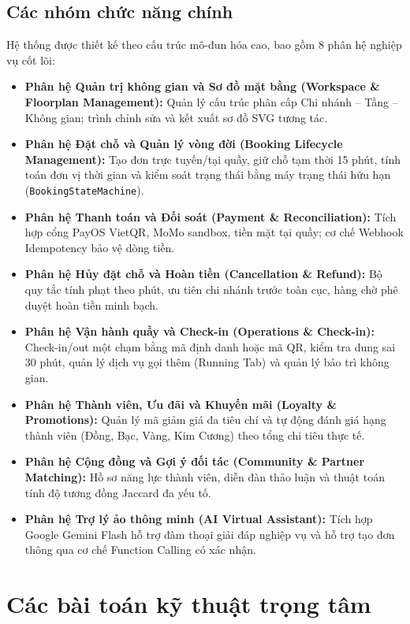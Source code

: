 \subsection{Các nhóm chức năng chính}
Hệ thống được thiết kế theo cấu trúc mô-đun hóa cao, bao gồm 8 phân hệ nghiệp vụ cốt lõi:
\begin{itemize}
    \item \textbf{Phân hệ Quản trị không gian và Sơ đồ mặt bằng (Workspace \& Floorplan Management):} Quản lý cấu trúc phân cấp Chi nhánh -- Tầng -- Không gian; trình chỉnh sửa và kết xuất sơ đồ SVG tương tác.
    \item \textbf{Phân hệ Đặt chỗ và Quản lý vòng đời (Booking Lifecycle Management):} Tạo đơn trực tuyến/tại quầy, giữ chỗ tạm thời 15 phút, tính toán đơn vị thời gian và kiểm soát trạng thái bằng máy trạng thái hữu hạn (\texttt{BookingStateMachine}).
    \item \textbf{Phân hệ Thanh toán và Đối soát (Payment \& Reconciliation):} Tích hợp cổng PayOS VietQR, MoMo sandbox, tiền mặt tại quầy; cơ chế Webhook Idempotency bảo vệ dòng tiền.
    \item \textbf{Phân hệ Hủy đặt chỗ và Hoàn tiền (Cancellation \& Refund):} Bộ quy tắc tính phạt theo phút, ưu tiên chi nhánh trước toàn cục, hàng chờ phê duyệt hoàn tiền minh bạch.
    \item \textbf{Phân hệ Vận hành quầy và Check-in (Operations \& Check-in):} Check-in/out một chạm bằng mã định danh hoặc mã QR, kiểm tra dung sai 30 phút, quản lý dịch vụ gọi thêm (Running Tab) và quản lý bảo trì không gian.
    \item \textbf{Phân hệ Thành viên, Ưu đãi và Khuyến mãi (Loyalty \& Promotions):} Quản lý mã giảm giá đa tiêu chí và tự động đánh giá hạng thành viên (Đồng, Bạc, Vàng, Kim Cương) theo tổng chi tiêu thực tế.
    \item \textbf{Phân hệ Cộng đồng và Gợi ý đối tác (Community \& Partner Matching):} Hồ sơ năng lực thành viên, diễn đàn thảo luận và thuật toán tính độ tương đồng Jaccard đa yếu tố.
    \item \textbf{Phân hệ Trợ lý ảo thông minh (AI Virtual Assistant):} Tích hợp Google Gemini Flash hỗ trợ đàm thoại giải đáp nghiệp vụ và hỗ trợ tạo đơn thông qua cơ chế Function Calling có xác nhận.
\end{itemize}

\section{Các bài toán kỹ thuật trọng tâm}
\label{sec:baitoan_kythuat}

